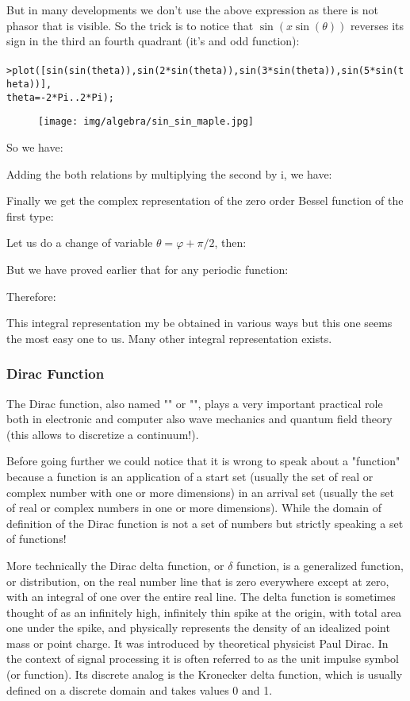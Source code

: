 	But in many developments we don't use the above expression as there is not phasor that is visible. So the trick is to notice that $\sin(x\sin(\theta))$ reverses its sign in the third an fourth quadrant (it's and odd function):\\\\
		\texttt{>plot([sin(sin(theta)),sin(2*sin(theta)),sin(3*sin(theta)),sin(5*sin(theta))],\\
	theta=-2*Pi..2*Pi);}
	\begin{figure}[H]
		\centering
		\texttt{[image: img/algebra/sin\_sin\_maple.jpg]}
	\end{figure}
	So we have:
	
	Adding the both relations by multiplying the second by $\mathrm{i}$,  we have:
	
	Finally we get the complex representation of the zero order Bessel function of the first type:
	
	
	Let us do a change of variable $\theta=\varphi+\pi/2$, then:
	
	But we have proved earlier that for any periodic function:
	
	Therefore:
	
	This integral representation my be obtained in various ways but this one seems the most easy one to us. Many other integral representation exists.

	\subsubsection{Dirac Function}
	The Dirac function, also named "\label{dirac function}" or "", plays a very important practical role both in electronic and computer also  wave mechanics and quantum field theory (this allows to discretize a continuum!).
	
	Before going further we could notice that it is wrong to speak about a "function" because a function is an application of a start set (usually the set of real or complex number with one or more dimensions) in an arrival set (usually the set of real or complex numbers in one or more dimensions). While the domain of definition of the Dirac function is not a set of numbers but strictly speaking a set of functions!
	
	More technically the Dirac delta function, or $\delta$ function, is a generalized function, or distribution, on the real number line that is zero everywhere except at zero, with an integral of one over the entire real line. The delta function is sometimes thought of as an infinitely high, infinitely thin spike at the origin, with total area one under the spike, and physically represents the density of an idealized point mass or point charge. It was introduced by theoretical physicist Paul Dirac. In the context of signal processing it is often referred to as the unit impulse symbol (or function). Its discrete analog is the Kronecker delta function, which is usually defined on a discrete domain and takes values 0 and 1.
	
